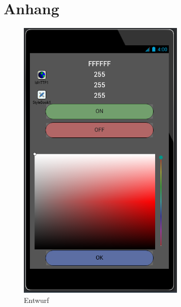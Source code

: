 \section{Anhang}
\begin{figure}[h]
\begin{center}
\includegraphics[width=8cm]{img/entwurf.png}
\caption{Entwurf}
\label{entwurf}
\end{center}
\end{figure}

